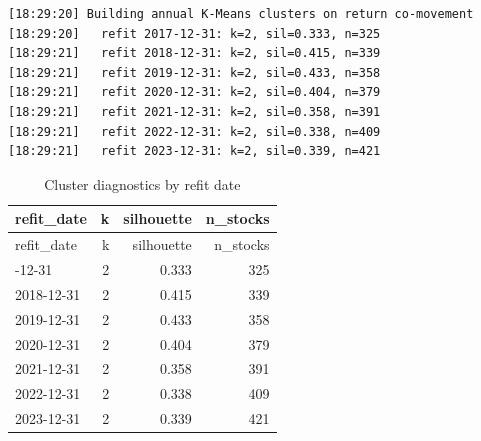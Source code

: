 \documentclass[
  letterpaper,
  DIV=11,
  numbers=noendperiod]{scrartcl}
\newenvironment{Shaded}{\begin{snugshade}}{\end{snugshade}}
\newcommand{\AttributeTok}[1]{\textcolor[rgb]{0.40,0.45,0.13}{#1}}
\newcommand{\DecValTok}[1]{\textcolor[rgb]{0.68,0.00,0.00}{#1}}
\newcommand{\FloatTok}[1]{\textcolor[rgb]{0.68,0.00,0.00}{#1}}
\newcommand{\FunctionTok}[1]{\textcolor[rgb]{0.28,0.35,0.67}{#1}}
\newcommand{\NormalTok}[1]{\textcolor[rgb]{0.00,0.23,0.31}{#1}}
\newcommand{\SpecialCharTok}[1]{\textcolor[rgb]{0.37,0.37,0.37}{#1}}
\newcommand{\StringTok}[1]{\textcolor[rgb]{0.13,0.47,0.30}{#1}}
\begin{document}
\begin{verbatim}
[18:29:20] Building annual K-Means clusters on return co-movement
[18:29:20]   refit 2017-12-31: k=2, sil=0.333, n=325
[18:29:21]   refit 2018-12-31: k=2, sil=0.415, n=339
[18:29:21]   refit 2019-12-31: k=2, sil=0.433, n=358
[18:29:21]   refit 2020-12-31: k=2, sil=0.404, n=379
[18:29:21]   refit 2021-12-31: k=2, sil=0.358, n=391
[18:29:21]   refit 2022-12-31: k=2, sil=0.338, n=409
[18:29:21]   refit 2023-12-31: k=2, sil=0.339, n=421
\end{verbatim}

\begin{Shaded}
\end{Shaded}

\begin{longtable}[]{@{}lrrr@{}}
\caption{Cluster diagnostics by refit date}\tabularnewline
\toprule\noalign{}
refit\_date & k & silhouette & n\_stocks \\
\midrule\noalign{}
\endfirsthead
\toprule\noalign{}
refit\_date & k & silhouette & n\_stocks \\
\midrule\noalign{}
\endhead
\bottomrule\noalign{}
\endlastfoot
2017-12-31 & 2 & 0.333 & 325 \\
2018-12-31 & 2 & 0.415 & 339 \\
2019-12-31 & 2 & 0.433 & 358 \\
2020-12-31 & 2 & 0.404 & 379 \\
2021-12-31 & 2 & 0.358 & 391 \\
2022-12-31 & 2 & 0.338 & 409 \\
2023-12-31 & 2 & 0.339 & 421 \\
\end{longtable}

\begin{Shaded}
\end{Shaded}
\end{document}
